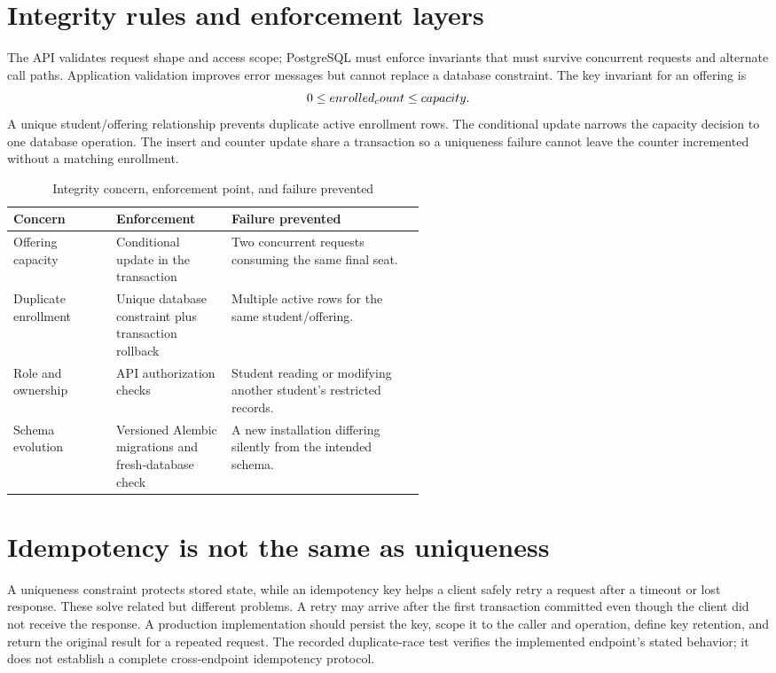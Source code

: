 \documentclass[11pt,a4paper,oneside]{report}
\begin{document}
\section{Integrity rules and enforcement layers}
The API validates request shape and access scope; PostgreSQL must enforce invariants that must survive concurrent requests and alternate call paths. Application validation improves error messages but cannot replace a database constraint. The key invariant for an offering is
\begin{equation}
0 \leq enrolled\\_count \leq capacity.
\end{equation}
A unique student/offering relationship prevents duplicate active enrollment rows. The conditional update narrows the capacity decision to one database operation. The insert and counter update share a transaction so a uniqueness failure cannot leave the counter incremented without a matching enrollment.

\begin{table}[htbp]
\centering\small
\caption{Integrity concern, enforcement point, and failure prevented}\label{tab:integrity}
\begin{tabularx}{\linewidth}{@{}p{0.25\linewidth}p{0.29\linewidth}X@{}}\toprule
\textbf{Concern} & \textbf{Enforcement} & \textbf{Failure prevented} \\\midrule
Offering capacity & Conditional update in the transaction & Two concurrent requests consuming the same final seat. \\
Duplicate enrollment & Unique database constraint plus transaction rollback & Multiple active rows for the same student/offering. \\
Role and ownership & API authorization checks & Student reading or modifying another student's restricted records. \\
Schema evolution & Versioned Alembic migrations and fresh-database check & A new installation differing silently from the intended schema. \\
\bottomrule
\end{tabularx}
\end{table}

\section{Idempotency is not the same as uniqueness}
A uniqueness constraint protects stored state, while an idempotency key helps a client safely retry a request after a timeout or lost response. These solve related but different problems. A retry may arrive after the first transaction committed even though the client did not receive the response. A production implementation should persist the key, scope it to the caller and operation, define key retention, and return the original result for a repeated request. The recorded duplicate-race test verifies the implemented endpoint's stated behavior; it does not establish a complete cross-endpoint idempotency protocol.
\end{document}
